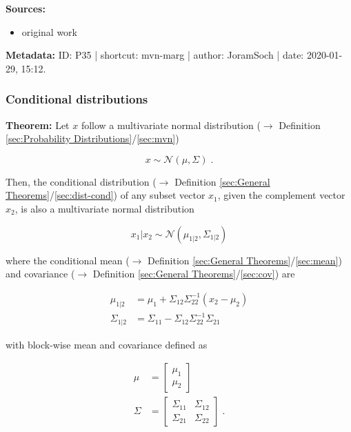 \documentclass[a4paper,12pt,twoside]{book}
\begin{document}
\vspace{1em}
\textbf{Sources:}
\begin{itemize}
\item original work\end{itemize}


\vspace{1em}
\textbf{Metadata:} ID: P35 | shortcut: mvn-marg | author: JoramSoch | date: 2020-01-29, 15:12.
\vspace{1em}



\subsubsection[\textbf{Conditional distributions}]{Conditional distributions} \label{sec:mvn-cond}
\setcounter{equation}{0}

\textbf{Theorem:} Let $x$ follow a multivariate normal distribution ($\rightarrow$ Definition \ref{sec:Probability Distributions}/\ref{sec:mvn})

\begin{equation} \label{eq:mvn-cond-mvn}
x \sim \mathcal{N}(\mu, \Sigma) \; .
\end{equation}

Then, the conditional distribution ($\rightarrow$ Definition \ref{sec:General Theorems}/\ref{sec:dist-cond}) of any subset vector $x_1$, given the complement vector $x_2$, is also a multivariate normal distribution

\begin{equation} \label{eq:mvn-cond-mvn-cond}
x_1|x_2 \sim \mathcal{N}(\mu_{1|2}, \Sigma_{1|2})
\end{equation}

where the conditional mean ($\rightarrow$ Definition \ref{sec:General Theorems}/\ref{sec:mean}) and covariance ($\rightarrow$ Definition \ref{sec:General Theorems}/\ref{sec:cov}) are

\begin{equation} \label{eq:mvn-cond-mvn-cond-hyp}
\begin{split}
\mu_{1|2} &= \mu_1 + \Sigma_{12} \Sigma_{22}^{-1} (x_2 - \mu_2) \\
\Sigma_{1|2} &= \Sigma_{11} - \Sigma_{12} \Sigma_{22}^{-1} \Sigma_{21}
\end{split}
\end{equation}

with block-wise mean and covariance defined as

\begin{equation} \label{eq:mvn-cond-mvn-joint-hyp}
\begin{split}
\mu &= \begin{bmatrix} \mu_1 \\ \mu_2 \end{bmatrix} \\
\Sigma &= \begin{bmatrix} \Sigma_{11} & \Sigma_{12} \\ \Sigma_{21} & \Sigma_{22} \end{bmatrix} \; .
\end{split}
\end{equation}
\end{document}
